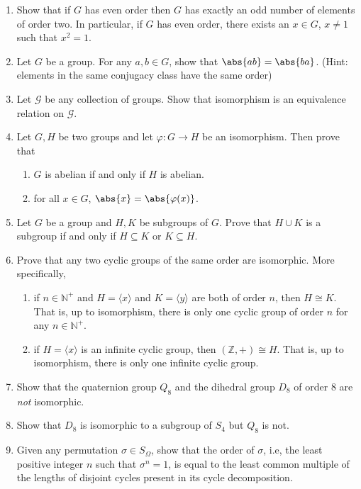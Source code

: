 \begin{enumerate}[resume]
    \item Show that if $G$ has even order then $G$ has exactly an odd number of elements of order two. In particular, if $G$ has even order, there exists an $x \in G$, $x \neq 1$ such that $x^2 = 1$.
    \item Let $G$ be a group. For any $a,b \in G$, show that $\abs{ab} = \abs{ba}$. (Hint: elements in the same conjugacy class have the same order)
    \item Let $\mathcal{G}$ be any collection of groups. Show that isomorphism is an equivalence relation on $\mathcal{G}$.
    \item Let $G,H$ be two groups and let $\varphi \colon G \to H$ be an isomorphism. Then prove that
    \begin{enumerate}
        \item $G$ is abelian if and only if $H$ is abelian.
        \item for all $x \in G$, $\abs{x} = \abs{\varphi(x)}$.
    \end{enumerate}
    \item Let $G$ be a group and $H,K$ be subgroups of $G$. Prove that $H \cup K$ is a subgroup if and only if $H \subseteq K$ or $K \subseteq H$.
    \item Prove that any two cyclic groups of the same order are isomorphic. More specifically, 
    \begin{enumerate}
        \item if $n \in \mathbb{N}^+$ and $H = \langle x \rangle$ and $K = \langle y \rangle$ are both of order $n$, then $H \cong K$. That is, up to isomorphism, there is only one cyclic group of order $n$ for any $n \in \mathbb{N}^+$.
        \item if $H = \langle x \rangle$ is an infinite cyclic group, then $(\mathbb{Z},+) \cong H$. That is, up to isomorphism, there is only one infinite cyclic group.
    \end{enumerate}
    \item Show that the quaternion group $Q_8$ and the dihedral group $D_8$ of order $8$ are \emph{not} isomorphic.
    \item Show that $D_8$ is isomorphic to a subgroup of $S_4$ but $Q_8$ is not.
    \item Given any permutation $\sigma \in S_{\Omega}$, show that the order of $\sigma$, i.e, the least positive integer $n$ such that $\sigma^n = 1$, is equal to the least common multiple of the lengths of disjoint cycles present in its cycle decomposition.

\end{enumerate}
